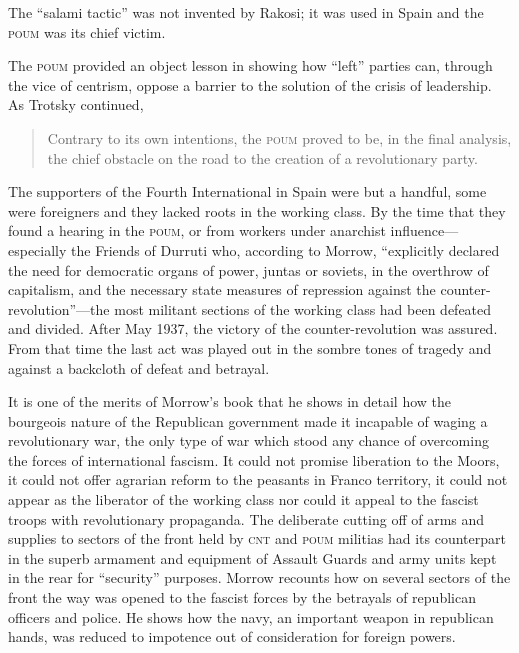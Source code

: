 The ``salami tactic'' was not invented by Rakosi; it was used in Spain and the \textsc{poum} was its chief victim.

The \textsc{poum} provided an object lesson in showing how ``left'' parties can, through the vice of centrism, oppose a barrier to the solution of the crisis of leadership. As Trotsky continued,

\begin{quotation}
  Contrary to its own intentions, the \textsc{poum} proved to be, in the final analysis, the chief obstacle on the road to the creation of a revolutionary party.
\end{quotation}

The supporters of the Fourth International in Spain were but a handful, some were foreigners and they lacked roots in the working class. By the time that they found a hearing in the \textsc{poum}, or from workers under anarchist influence---especially the Friends of Durruti who, according to Morrow, ``explicitly declared the need for democratic organs of power, juntas or soviets, in the overthrow of capitalism, and the necessary state measures of repression against the counter-revolution''---the most militant sections of the working class had been defeated and divided. After May 1937, the victory of the counter-revolution was assured. From that time the last act was played out in the sombre tones of tragedy and against a backcloth of defeat and betrayal.

It is one of the merits of Morrow’s book that he shows in detail how the bourgeois nature of the Republican government made it incapable of waging a revolutionary war, the only type of war which stood any chance of overcoming the forces of international fascism. It could not promise liberation to the Moors, it could not offer agrarian reform to the peasants in Franco territory, it could not appear as the liberator of the working class nor could it appeal to the fascist troops with revolutionary propaganda. The deliberate cutting off of arms and supplies to sectors of the front held by \textsc{cnt} and \textsc{poum} militias had its counterpart in the superb armament and equipment of Assault Guards and army units kept in the rear for ``security'' purposes. Morrow recounts how on several sectors of the front the way was opened to the fascist forces by the betrayals of republican officers and police. He shows how the navy, an important weapon in republican hands, was reduced to impotence out of consideration for foreign powers.

